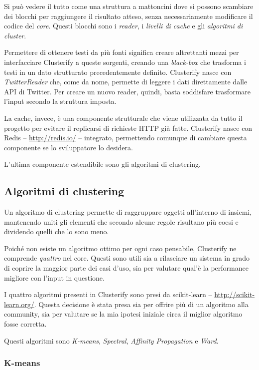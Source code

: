 	Si può vedere il tutto come una struttura a mattoncini dove si possono scambiare dei blocchi per raggiungere il risultato atteso, senza necessariamente modificare il codice del \emph{core}. Questi blocchi sono i \emph{reader}, i \emph{livelli di cache} e gli \emph{algoritmi di cluster}.
	
	Permettere di ottenere testi da più fonti significa creare altrettanti mezzi per interfacciare Clusterify a queste sorgenti, creando una \emph{black-box} che trasforma i testi in un dato strutturato precedentemente definito. Clusterify nasce con \emph{TwitterReader} che, come da nome, permette di leggere i dati direttamente dalle API di Twitter. Per creare un nuovo reader, quindi, basta soddisfare trasformare l'input secondo la struttura imposta.

	La cache, invece, è una componente strutturale che viene utilizzata da tutto il progetto per evitare il replicarsi di richieste HTTP già fatte. Clusterify nasce con Redis -- \url{http://redis.io/} -- integrato, permettendo comunque di cambiare questa componente se lo sviluppatore lo desidera.

	L'ultima componente estendibile sono gli algoritmi di clustering.

	\subsection{Algoritmi di clustering}
		Un algoritmo di clustering permette di raggruppare oggetti all'interno di insiemi, mantenendo uniti gli elementi che secondo alcune regole risultano più coesi e dividendo quelli che lo sono meno.

		Poiché non esiste un algoritmo ottimo per ogni caso pensabile, Clusterify ne comprende \emph{quattro} nel core. Questi sono utili sia a rilasciare un sistema in grado di coprire la maggior parte dei casi d'uso, sia per valutare qual'è la performance migliore con l'input in questione.

		I quattro algoritmi presenti in Clusterify sono presi da scikit-learn -- \url{http://scikit-learn.org/}. Questa decisione è stata presa sia per offrire più di un algoritmo alla community, sia per valutare se la mia ipotesi iniziale circa il miglior algoritmo fosse corretta. 

		Questi algoritmi sono \emph{K-means}, \emph{Spectral}, \emph{Affinity Propagation} e \emph{Ward}.

		\subsubsection{K-means}
			

